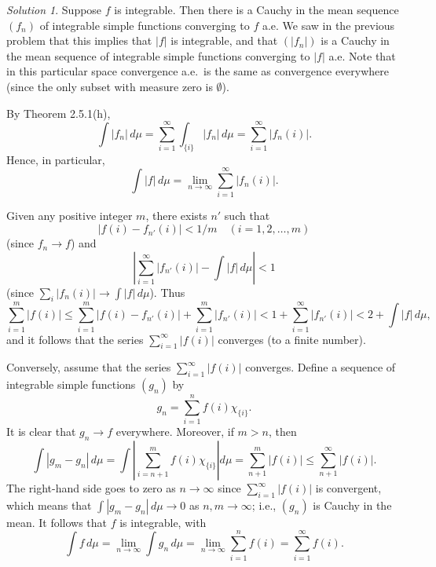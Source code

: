 \documentclass{report}
\theoremstyle{remark}
\newtheorem*{solution}{Solution}
\begin{document}
\begin{solution}
  Suppose $f$ is integrable. Then there is a Cauchy in the mean sequence $(f_n)$ of integrable simple functions converging to $f$ a.e. We saw in the previous problem that this implies that $|f|$ is integrable, and that $(|f_n|)$ is a Cauchy in the mean sequence of integrable simple functions converging to $|f|$ a.e. Note that in this particular space convergence a.e.\ is the same as convergence everywhere (since the only subset with measure zero is $\emptyset$).

  By Theorem 2.5.1(h),
  \begin{equation*}
    \int |f_n| \, d\mu = \sum_{i=1}^\infty \int_{\{i\}} |f_n| \, d\mu = \sum_{i=1}^\infty |f_n(i)|.
  \end{equation*}
  Hence, in particular,
  \begin{equation*}
    \int |f| \, d\mu = \lim_{n \to \infty} \sum_{i=1}^\infty |f_n(i)|.
  \end{equation*}

  Given any positive integer $m$, there exists $n'$ such that
  \begin{equation*}
    {|f(i) - f_{n'}(i)|} < 1/m \quad (i = 1, 2, \dots, m)
  \end{equation*}
  (since $f_n \to f$) and
  \begin{equation*}
    \left| \sum_{i=1}^\infty |f_{n'}(i)| - \int |f| \, d\mu \right| < 1
  \end{equation*}
  (since $\sum_i |f_n(i)| \to \int |f| \, d\mu$). Thus
  \begin{equation*}
    \sum_{i=1}^m |f(i)| \le \sum_{i=1}^m |f(i) - f_{n'}(i)| + \sum_{i=1}^m |f_{n'}(i)| < 1 + \sum_{i=1}^\infty |f_{n'}(i)| < 2 + \int |f| \, d\mu,
  \end{equation*}
  and it follows that the series $\sum_{i=1}^\infty |f(i)|$ converges (to a finite number).

  Conversely, assume that the series $\sum_{i=1}^\infty |f(i)|$ converges. Define a sequence of integrable simple functions $(g_n)$ by
  \begin{equation*}
    g_n = \sum_{i=1}^n f(i) \chi_{\{i\}}.
  \end{equation*}
  It is clear that $g_n \to f$ everywhere. Moreover, if $m > n$, then
  \begin{equation*}
    \int |g_m - g_n| \, d\mu = \int \left| \sum_{i=n+1}^m f(i) \chi_{\{i\}} \right| d\mu = \sum_{n+1}^m |f(i)| \le \sum_{n+1}^\infty |f(i)|.
  \end{equation*}
  The right-hand side goes to zero as $n \to \infty$ since $\sum_{i=1}^\infty |f(i)|$ is convergent, which means that $\int |g_m - g_n| \, d\mu \to 0$ as $n,m \to \infty$; i.e., $(g_n)$ is Cauchy in the mean. It follows that $f$ is integrable, with
  \begin{equation*}
    \int f \, d\mu = \lim_{n \to \infty} \int g_n \, d\mu = \lim_{n \to \infty} \sum_{i=1}^n f(i) = \sum_{i=1}^\infty f(i).
  \end{equation*}
\end{solution}
\end{document}
